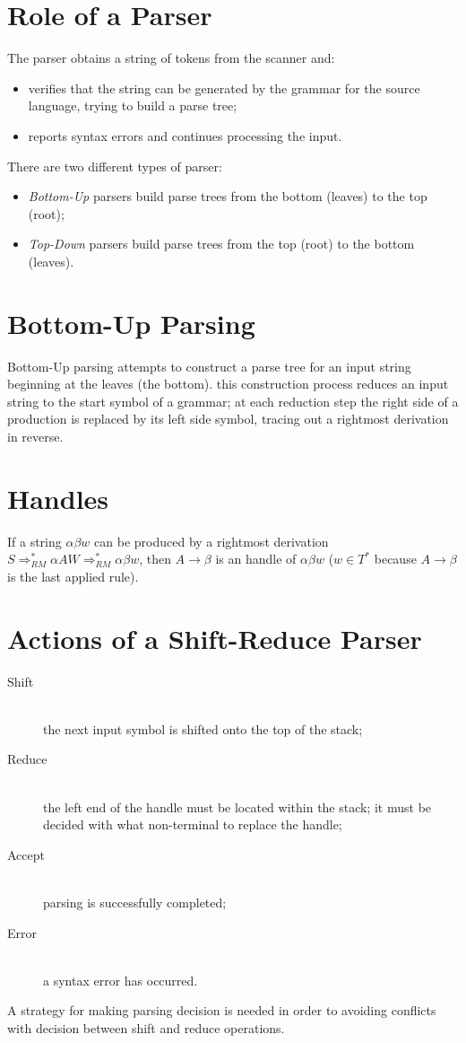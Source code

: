 \section{Role of a Parser}
The parser obtains a string of tokens from the scanner and:
\begin{itemize}
	\item verifies that the string can be generated by the grammar for the source language, trying to build a parse tree;
	\item reports syntax errors and continues processing the input.
\end{itemize}
There are two different types of parser:
\begin{itemize}
	\item \emph{Bottom-Up} parsers build parse trees from the bottom (leaves) to the top (root);
	\item \emph{Top-Down} parsers build parse trees from the top (root) to the bottom (leaves).
\end{itemize}

\section{Bottom-Up Parsing}
Bottom-Up parsing attempts to construct a parse tree for an input string beginning at the leaves (the bottom).
this construction process reduces an input string to the start symbol of a grammar; at each reduction step the right side of a production is replaced by its left side symbol, tracing out a rightmost derivation in reverse.

\section{Handles}
If a string $\alpha \beta w$ can be produced by a rightmost derivation $S \Rightarrow^\ast_{RM} \alpha AW \Rightarrow^\ast_{RM} \alpha \beta w$, then $A \to \beta$ is an handle of $\alpha \beta w$ ($w \in T^\ast$ because $A \to \beta$ is the last applied rule).

\section{Actions of a Shift-Reduce Parser}
\begin{description}
	\item[Shift]\mbox{}\\
	the next input symbol is shifted onto the top of the stack;
	\item[Reduce]\mbox{}\\
	the left end of the handle must be located within the stack; it must be decided with what non-terminal to replace the handle;
	\item[Accept]\mbox{}\\
	parsing is successfully completed;
	\item[Error]\mbox{}\\
	a syntax error has occurred.
\end{description}
A strategy for making parsing decision is needed in order to avoiding conflicts with decision between shift and reduce operations.

